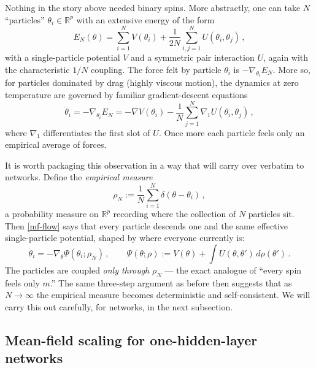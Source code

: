 \documentclass[11pt]{article}
\newcommand{\R}{\mathbb{R}}
\begin{document}
Nothing in the story above needed binary spins. More abstractly, one can take $N$ ``particles'' $\theta_i\in\R^p$ with an extensive energy of the form
%
\begin{equation} \label{mf-H}
    E_N(\theta) = \sum_{i=1}^N V(\theta_i) + \frac{1}{2N}\sum_{i,j=1}^N U(\theta_i,\theta_j)\,,
\end{equation}
%
with a single-particle potential $V$ and a symmetric pair interaction $U$, again with the characteristic $1/N$ coupling. 
The force felt by particle $\theta_i$ is $-\nabla_{\theta_i} E_N$. More so, for particles dominated by drag (highly viscous motion), the dynamics at zero temperature are governed by familiar gradient-descent equations 
%
\begin{equation} \label{mf-flow}
    \dot\theta_i = -\nabla_{\theta_i} E_N = -\nabla V(\theta_i) - \frac{1}{N} \sum_{j=1}^N \nabla_1 U(\theta_i,\theta_j)\,,
\end{equation}
%
where $\nabla_1$ differentiates the first slot of $U$. Once more each particle feels only an empirical average of forces.

It is worth packaging this observation in a way that will carry over verbatim to networks. Define the \emph{empirical measure}
%
\begin{equation} \label{mf-rho}
    \rho_N := \frac{1}{N}\sum_{i=1}^N \delta(\theta-\theta_i)\,,
\end{equation}
%
a probability measure on $\R^p$ recording where the collection of $N$ particles sit. Then \eqref{mf-flow} says that every particle descends one and the same effective single-particle potential, shaped by where everyone currently is:
%
\begin{equation} \label{mf-Psi}
    \dot\theta_i = -\nabla_\theta \Psi(\theta_i;\rho_N)\,,\qquad
    \Psi(\theta;\rho) := V(\theta) + \int U(\theta,\theta')\,d\rho(\theta')\,.
\end{equation}
%
The particles are coupled \emph{only through} $\rho_N$ --- the exact analogue of ``every spin feels only $m$.'' The same three-step argument as before then suggests that as $N\to\infty$ the empirical measure becomes deterministic and self-consistent. We will carry this out carefully, for networks, in the next subsection.

\subsection{Mean-field scaling for one-hidden-layer networks}
\label{sec:MFT-1hl}
\end{document}
